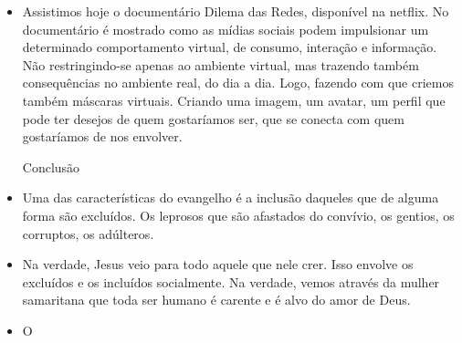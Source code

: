 \documentclass[12pt, legalpaper]{article}
\begin{document}
\begin{itemize}
   \item Assistimos hoje o documentário Dilema das Redes, disponível na netflix. No documentário é mostrado como as mídias sociais podem impulsionar um determinado comportamento virtual, de consumo, interação e informação. Não restringindo-se apenas ao ambiente virtual, mas trazendo também consequências no ambiente real, do dia a dia. Logo, fazendo com que criemos também máscaras virtuais. Criando uma imagem, um avatar, um perfil que pode ter desejos de quem gostaríamos ser, que se conecta com quem gostaríamos de nos envolver. 


   \begin{large}Conclusão\end{large}

   \item Uma das características do evangelho é a inclusão daqueles que de alguma forma são excluídos. 
   Os leprosos que são afastados do convívio, os gentios, os corruptos, os adúlteros. 

   \item Na verdade, Jesus veio para todo aquele que nele crer. Isso envolve os excluídos e os incluídos socialmente. Na verdade, vemos através da mulher samaritana que toda ser humano é carente e é alvo do amor de Deus.

   \item O

\end{itemize}
\end{document}
